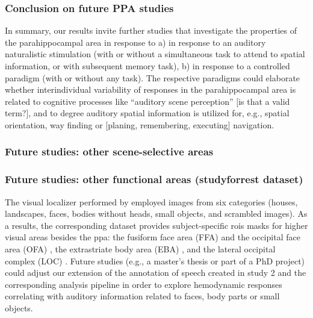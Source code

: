 \subsubsection{Conclusion on future PPA studies}

%
In summary, our results invite further studies that investigate the properties
of the parahippocampal area in response to
%
a) in response to an auditory naturalistic stimulation (with or without a
simultaneous task to attend to spatial information, or with subsequent memory
task),
%
b) in response to a controlled paradigm (with or without any task).
%
The respective paradigms could elaborate whether interindividual variability of
responses in the parahippocampal area is related to cognitive processes like
``auditory scene perception'' [is that a valid term?], and to degree auditory
spatial information is utilized for, e.g., spatial orientation, way finding or
[planing, remembering, executing] navigation.


\subsubsection{Future studies: other scene-selective areas}



\subsubsection{Future studies: other functional areas (studyforrest dataset)}


The visual localizer performed by \citet{sengupta2016extension} employed images
from six categories (houses, landscapes, faces, bodies without heads, small
objects, and scrambled images).
%
As a results, the corresponding dataset provides subject-specific \acp{roi}
masks for higher visual areas besides the \ac{ppa}:
%
the fusiform face area (FFA) \citep{kanwisher1997ffa} and the occipital face
area (OFA) \citep{pitcher2011occipitalfacearea},
%
the extrastriate body area (EBA) \citep{downing2001bodyarea},
%
and the lateral occipital complex (LOC) \citep{malach1995loc}.
%
Future studies (e.g., a master's thesis or part of a PhD project) could adjust
our extension of the annotation of speech created in study 2 and the
corresponding analysis pipeline in order to explore hemodynamic responses
correlating with auditory information related to faces, body parts or small
objects.





